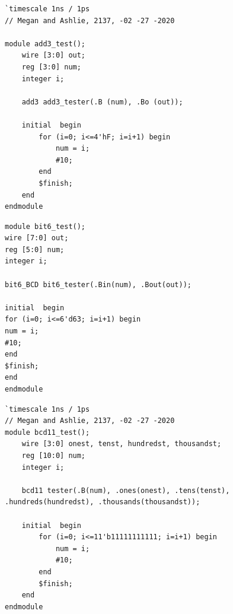 \documentclass[11pt]{article}
\begin{document}
\begin{lstlisting}[style=Verilog,caption=add3-test Testbench Code,label=code:ex ]
`timescale 1ns / 1ps
// Megan and Ashlie, 2137, -02 -27 -2020

module add3_test();
	wire [3:0] out;
	reg [3:0] num;
	integer i;
	
	add3 add3_tester(.B (num), .Bo (out));
	
	initial  begin
		for (i=0; i<=4'hF; i=i+1) begin
			num = i;
			#10;
		end
		$finish;
	end
endmodule
\end{lstlisting}

\begin{lstlisting}[style=Verilog,caption=bit6-BCD-test Testbench Code,label=code:ex ]
module bit6_test();
wire [7:0] out;
reg [5:0] num;
integer i;

bit6_BCD bit6_tester(.Bin(num), .Bout(out));

initial  begin
for (i=0; i<=6'd63; i=i+1) begin
num = i;
#10;
end
$finish;
end
endmodule
\end{lstlisting}

\begin{lstlisting}[style=Verilog,caption=bcd11-test Testbench Code,label=code:ex ]
`timescale 1ns / 1ps
// Megan and Ashlie, 2137, -02 -27 -2020
module bcd11_test();
	wire [3:0] onest, tenst, hundredst, thousandst;
	reg [10:0] num;
	integer i;
	
	bcd11 tester(.B(num), .ones(onest), .tens(tenst), .hundreds(hundredst), .thousands(thousandst));
	
	initial  begin
		for (i=0; i<=11'b11111111111; i=i+1) begin
			num = i;
			#10;
		end
		$finish;
	end
endmodule
\end{lstlisting}
\end{document}
